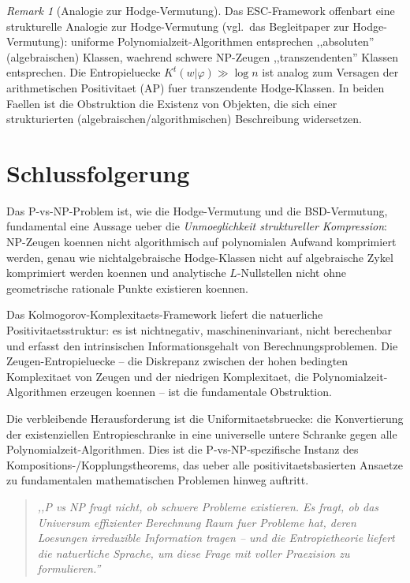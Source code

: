 \documentclass[aps,prd,twocolumn,superscriptaddress,nofootinbib]{revtex4-2}
\theoremstyle{definition}
\theoremstyle{remark}
\newtheorem{remark}[theorem]{Remark}
\newcommand{\NP}{\mathrm{NP}}
\newcommand{\PP}{\mathrm{P}}
\begin{document}
\begin{remark}[Analogie zur Hodge-Vermutung]
\label{rem:hodge-analogy}
Das ESC-Framework offenbart eine strukturelle Analogie zur Hodge-Vermutung (vgl.\ das Begleitpaper zur Hodge-Vermutung): uniforme Polynomialzeit-Algorithmen entsprechen ,,absoluten'' (algebraischen) Klassen, waehrend schwere NP-Zeugen ,,transzendenten'' Klassen entsprechen. Die Entropieluecke $K^t(w|\varphi) \gg \log n$ ist analog zum Versagen der arithmetischen Positivitaet (AP) fuer transzendente Hodge-Klassen. In beiden Faellen ist die Obstruktion die Existenz von Objekten, die sich einer strukturierten (algebraischen/algorithmischen) Beschreibung widersetzen.
\end{remark}


\section{Schlussfolgerung}
\label{sec:conclusion}

Das $\PP$-vs-$\NP$-Problem ist, wie die Hodge-Vermutung und die BSD-Vermutung, fundamental eine Aussage ueber die \textit{Unmoeglichkeit struktureller Kompression}: NP-Zeugen koennen nicht algorithmisch auf polynomialen Aufwand komprimiert werden, genau wie nichtalgebraische Hodge-Klassen nicht auf algebraische Zykel komprimiert werden koennen und analytische $L$-Nullstellen nicht ohne geometrische rationale Punkte existieren koennen.

Das Kolmogorov-Komplexitaets-Framework liefert die natuerliche Positivitaetsstruktur: es ist nichtnegativ, maschineninvariant, nicht berechenbar und erfasst den intrinsischen Informationsgehalt von Berechnungsproblemen. Die Zeugen-Entropieluecke -- die Diskrepanz zwischen der hohen bedingten Komplexitaet von Zeugen und der niedrigen Komplexitaet, die Polynomialzeit-Algorithmen erzeugen koennen -- ist die fundamentale Obstruktion.

Die verbleibende Herausforderung ist die Uniformitaetsbruecke: die Konvertierung der existenziellen Entropieschranke in eine universelle untere Schranke gegen alle Polynomialzeit-Algorithmen. Dies ist die P-vs-NP-spezifische Instanz des Kompositions-/Kopplungstheorems, das ueber alle positivitaetsbasierten Ansaetze zu fundamentalen mathematischen Problemen hinweg auftritt.

\begin{quote}
\textit{,,P vs NP fragt nicht, ob schwere Probleme existieren. Es fragt, ob das Universum effizienter Berechnung Raum fuer Probleme hat, deren Loesungen irreduzible Information tragen -- und die Entropietheorie liefert die natuerliche Sprache, um diese Frage mit voller Praezision zu formulieren.''}
\end{quote}
\end{document}
